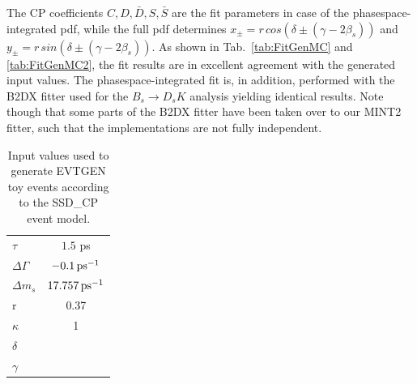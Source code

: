 The CP coefficients $C,D,\bar D,S,\bar S$ are the fit parameters in case of the phasespace-integrated pdf,
while the full pdf determines $x_\pm = r \, cos(\delta\pm(\gamma-2\beta_s))$ and $y_\pm = r \, sin(\delta\pm(\gamma-2\beta_s))$.
As shown in Tab.~\ref{tab:FitGenMC} and \ref{tab:FitGenMC2}, the fit results are in excellent agreement with the generated input values.
The phasespace-integrated fit is, in addition, performed with the \textsf{B2DX} fitter used for the $B_s \to D_s K$ analysis yielding identical results.
Note though that some parts of the \textsf{B2DX} fitter have been taken over to our \textsf{MINT2} fitter, such that the implementations are not fully independent.

\begin{table}[h]
\caption{Input values used to generate \textsf{EVTGEN} toy events according to the \textsf{SSD\_CP} event model.} 		
  \centering
  \begin{tabular}
    {l c}
    \hline \hline
    $\tau$  & $1.5$ ps \\   
    $\Delta\Gamma$  & $-0.1 {\mathrm{ \,ps}}^{-1}$ \\   
     $\Delta m_s$  & $17.757 {\mathrm{ \,ps}}^{-1}$ \\   
     r & 0.37\\
     $\kappa$ & 1\\
     $\delta$ & \\
     $\gamma$ & \\
    \hline \hline
  \end{tabular}
  \label{tab:InputGenMC}
\end{table}

